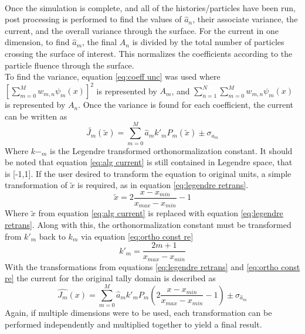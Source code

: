 \documentclass[10tma4paper]{article}
\begin{document}
\\
Once the simulation is complete, and all of the histories/particles have been run, post processing  is performed to find the values of $\hat{a}_{n}$, their associate variance, the current, and the overall variance through the surface. For the current in one dimension, to find $\hat{a}_{m}$, the final $A_{n}$ is divided by the total number of particles crossing the surface of interest. This normalizes the coefficients according to the particle fluence through the surface. \\
To find the variance, equation \eqref{eq:coeff unc} was used where $[\sum_{m=0}^{M}w_{m,n}\psi_{m}(x)]^{2}$ is represented by $A_{m}$, and $\sum_{n=1}^{N}\sum_{m=0}^{M}w_{m,n}\psi_{m}(x)$ is represented by $A_{n}$. Once the variance is found for each coefficient, the current can be written as
\begin{equation}\label{eq:alg current}
	\tilde{J_{m}}(\tilde{x}) = \sum_{m=0}^{M}\hat{a}_{m}k'_{m}P_{m}(\tilde{x}) \pm  \sigma_{\hat{a}_{m}}
\end{equation}
Where $k-_m$ is the Legendre transformed orthonormalization constant. It should be noted that equation \eqref{eq:alg current} is still contained in Legendre space, that is [-1,1]. If the user desired to transform the equation to original units, a simple transformation of $\tilde{x}$ is required, as in equation \eqref{eq:legendre retrans}.
\begin{equation}\label{eq:legendre retrans}
\tilde{x} = 2\frac{x-x_{min}}{x_{max}-x_{min}}-1
\end{equation}
Where $\tilde{x}$ from equation \eqref{eq:alg current} is replaced with equation \eqref{eq:legendre retrans}. Along with this, the orthonormalization constant must be transformed from $k'_{m}$ back to $k_{m}$ via equation \eqref{eq:ortho const re}
\begin{equation}\label{eq:ortho const re}
k'_{m} = \frac{2m+1}{x_{max}-x_{min}}
\end{equation}
With the transformations from equations \eqref{eq:legendre retrans} and \eqref{eq:ortho const re} the current for the original tally domain is described as 
\begin{equation}\label{eq:final current}
	\hat{J_{m}}(x) = \sum_{m=0}^{M}\hat{a}_{m}k'_{m}P_{m}(2\frac{x-x_{min}}{x_{max}-x_{min}}-1) \pm  \sigma_{\hat{a}_{m}}
\end{equation}
Again, if multiple dimensions were to be used, each transformation can be performed independently and multiplied together to yield a final result. 
\end{document}
